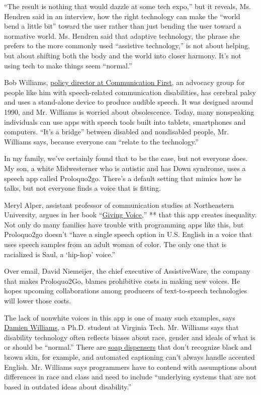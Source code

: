 ``The result is nothing that would dazzle at some tech expo,'' but it
reveals, Ms. Hendren said in an interview, how the right technology can
make the ``world bend a little bit'' toward the user rather than just
bending the user toward a normative world. Ms. Hendren said that
adaptive technology, the phrase she prefers to the more commonly used
``assistive technology,'' is not about helping, but about shifting both
the body and the world into closer harmony. It's not using tech to make
things seem ``normal.''

Bob Williams, \href{https://communicationfirst.org/mission/}{policy
director at Communication First}, an advocacy group for people like him
with speech-related communication disabilities, has cerebral palsy and
uses a stand-alone device to produce audible speech. It was designed
around 1990, and Mr. Williams is worried about obsolescence. Today, many
nonspeaking individuals can use apps with speech tools built into
tablets, smartphones and computers. ``It's a bridge'' between disabled
and nondisabled people, Mr. Williams says, because everyone can ``relate
to the technology.''

In my family, we've certainly found that to be the case, but not
everyone does. My son, a white Midwesterner who is autistic and has Down
syndrome, uses a speech app called Proloquo2go. There's a default
setting that mimics how he talks, but not everyone finds a voice that is
fitting.

Meryl Alper, assistant professor of communication studies at
Northeastern University, argues in her book
``\href{https://mitpress.mit.edu/books/giving-voice}{Giving Voice},'' **
that this app creates inequality. Not only do many families have trouble
with programming apps like this, but Proloquo2go doesn't ``have a single
speech option in U.S. English in a voice that uses speech samples from
an adult woman of color. The only one that is racialized is Saul, a
`hip-hop' voice.''

Over email, David Niemeijer, the chief executive of AssistiveWare, the
company that makes Proloquo2Go, blames prohibitive costs in making new
voices. He hopes upcoming collaborations among producers of
text-to-speech technologies will lower those costs.

The lack of nonwhite voices in this app is one of many such examples,
says
\href{https://liberalarts.vt.edu/departments-and-schools/department-of-science-technology-and-society/academic-programs/phd-science-and-technology-studies/students/2021/damien-Patrick-williams.html}{Damien
Williams}, a Ph.D. student at Virginia Tech. Mr. Williams says that
disability technology often reflects biases about race, gender and
ideals of what is or should be ``normal.'' There are
\href{https://gizmodo.com/why-cant-this-soap-dispenser-identify-dark-skin-1797931773}{soap
dispensers} that don't recognize black and brown skin, for example, and
automated captioning can't always handle accented English. Mr. Williams
says programmers have to contend with assumptions about differences in
race and class and need to include ``underlying systems that are not
based in outdated ideas about disability.''

